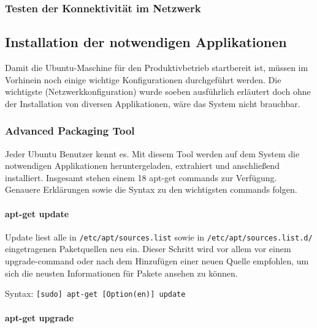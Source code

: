 \hypertarget{testen-der-konnektivituxe4t-im-netzwerk}{%
\subsubsection{Testen der Konnektivität im
Netzwerk}\label{testen-der-konnektivituxe4t-im-netzwerk}}

\hypertarget{installation-der-notwendigen-applikationen}{%
\subsection{Installation der notwendigen
Applikationen}\label{installation-der-notwendigen-applikationen}}

Damit die Ubuntu-Maschine für den Produktivbetrieb startbereit ist,
müssen im Vorhinein noch einige wichtige Konfigurationen durchgeführt
werden. Die wichtigste (Netzwerkkonfiguration) wurde soeben ausführlich
erläutert doch ohne der Installation von diversen Applikationen, wäre
das System nicht brauchbar.

\hypertarget{advanced-packaging-tool}{%
\subsubsection{Advanced Packaging Tool}\label{advanced-packaging-tool}}

Jeder Ubuntu Benutzer kennt es. Mit diesem Tool werden auf dem System
die notwendigen Applikationen heruntergeladen, extrahiert und
anschließend installiert. Insgesamt stehen einem 18 apt-get commands zur
Verfügung. Genauere Erklärungen sowie die Syntax zu den wichtigsten
commands folgen.

\hypertarget{apt-get-update}{%
\paragraph{apt-get update}\label{apt-get-update}}

Update liest alle in \texttt{/etc/apt/sources.list} sowie in
\texttt{/etc/apt/sources.list.d/} eingetragenen Paketquellen neu ein.
Dieser Schritt wird vor allem vor einem upgrade-command oder nach dem
Hinzufügen einer neuen Quelle empfohlen, um sich die neusten
Informationen für Pakete ansehen zu können.

Syntax: \texttt{{[}sudo{]}\ apt-get\ {[}Option(en){]}\ update}

\hypertarget{apt-get-upgrade}{%
\paragraph{apt-get upgrade}\label{apt-get-upgrade}}

